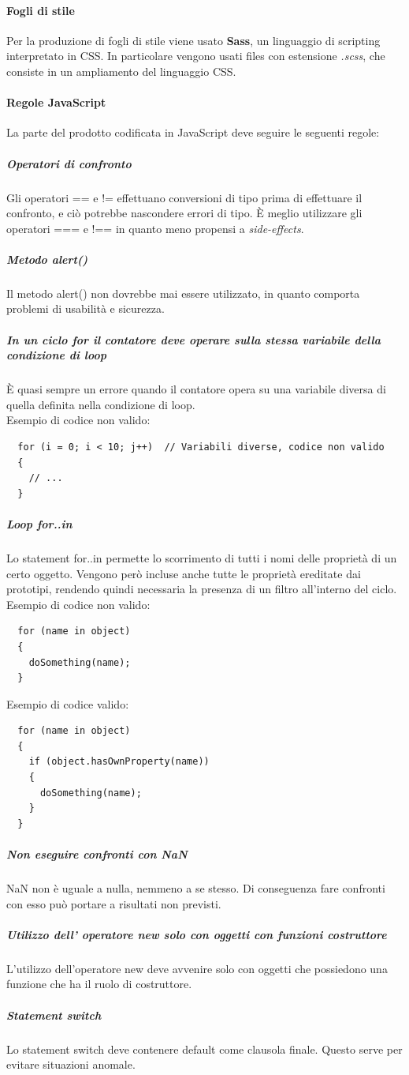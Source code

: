  \paragraph{Fogli di stile}
 Per la produzione di fogli di stile viene usato \textbf{Sass}, un linguaggio di scripting interpretato in CSS. In particolare vengono usati files con estensione \textit{.scss}, che consiste in un ampliamento del linguaggio CSS.
\paragraph{Regole JavaScript}
La parte del prodotto codificata in JavaScript deve seguire le seguenti regole:
\subparagraph{Operatori di confronto}
Gli operatori == e != effettuano conversioni di tipo prima di effettuare il confronto, e ciò potrebbe nascondere errori di tipo. È meglio utilizzare gli operatori === e !== in quanto meno propensi a \textit{side-effects}.
\subparagraph{Metodo alert()}
Il metodo alert() non dovrebbe mai essere utilizzato, in quanto comporta problemi di usabilità e sicurezza.
\subparagraph{In un ciclo for il contatore deve operare sulla stessa variabile della condizione di loop}
È quasi sempre un errore quando il contatore opera su una variabile diversa di quella definita nella condizione di loop.\\
Esempio di codice non valido:
\begin{verbatim}
  for (i = 0; i < 10; j++)  // Variabili diverse, codice non valido
  {  
    // ...
  }
\end{verbatim}

\subparagraph{Loop for..in}
Lo statement for..in permette lo scorrimento di tutti i nomi delle proprietà di un certo oggetto. Vengono però incluse anche tutte le proprietà ereditate dai prototipi, rendendo quindi necessaria la presenza di un filtro all'interno del ciclo.\\
Esempio di codice non valido:
\begin{verbatim}
  for (name in object) 
  {
    doSomething(name); 
  }
\end{verbatim}
Esempio di codice valido:
\begin{verbatim}
  for (name in object) 
  {
    if (object.hasOwnProperty(name)) 
    {
      doSomething(name);
    }
  }
\end{verbatim}
\subparagraph{Non eseguire confronti con NaN}
NaN non è uguale a nulla, nemmeno a se stesso. Di conseguenza fare confronti con esso può portare a risultati non previsti.
\subparagraph{Utilizzo dell' operatore new solo con oggetti con funzioni costruttore}
L'utilizzo dell'operatore new deve avvenire solo con oggetti che possiedono una funzione che ha il ruolo di costruttore.
\subparagraph{Statement switch}
Lo statement switch deve contenere default come clausola finale. Questo serve per evitare situazioni anomale.

